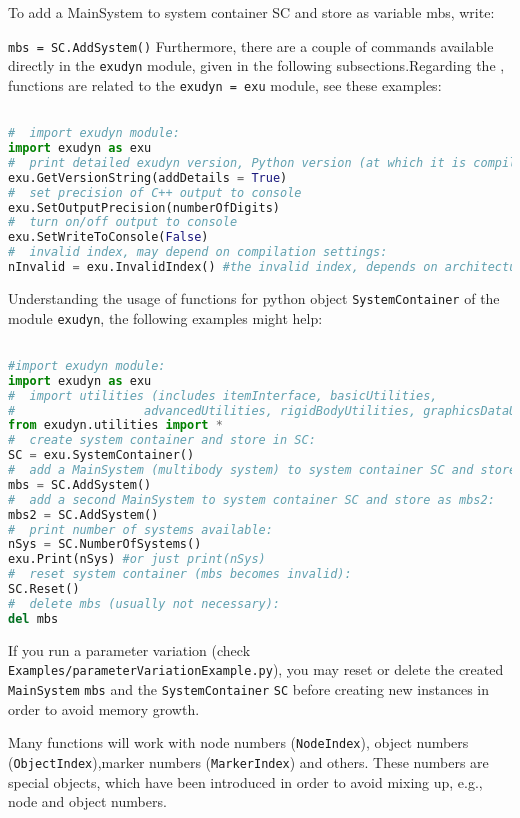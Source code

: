 To add a MainSystem to system container SC and store as variable mbs, write:
\bi
  \item[] \texttt{mbs = SC.AddSystem()}
\ei
Furthermore, there are a couple of commands available directly in the \texttt{exudyn} module, given in the following subsections.Regarding the , functions are related to the \texttt{exudyn = exu} module, see these examples:
\pythonstyle
\begin{lstlisting}[language=Python, firstnumber=1]

#  import exudyn module:
import exudyn as exu
#  print detailed exudyn version, Python version (at which it is compiled):
exu.GetVersionString(addDetails = True)
#  set precision of C++ output to console
exu.SetOutputPrecision(numberOfDigits)
#  turn on/off output to console
exu.SetWriteToConsole(False)
#  invalid index, may depend on compilation settings:
nInvalid = exu.InvalidIndex() #the invalid index, depends on architecture and version
\end{lstlisting}


Understanding the usage of functions for python object \texttt{SystemContainer} of the module \texttt{exudyn}, the following examples might help:
\pythonstyle
\begin{lstlisting}[language=Python, firstnumber=1]

#import exudyn module:
import exudyn as exu
#  import utilities (includes itemInterface, basicUtilities, 
#                  advancedUtilities, rigidBodyUtilities, graphicsDataUtilities):
from exudyn.utilities import *
#  create system container and store in SC:
SC = exu.SystemContainer()
#  add a MainSystem (multibody system) to system container SC and store as mbs:
mbs = SC.AddSystem()
#  add a second MainSystem to system container SC and store as mbs2:
mbs2 = SC.AddSystem()
#  print number of systems available:
nSys = SC.NumberOfSystems()
exu.Print(nSys) #or just print(nSys)
#  reset system container (mbs becomes invalid):
SC.Reset()
#  delete mbs (usually not necessary):
del mbs
\end{lstlisting}


If you run a parameter variation (check \texttt{Examples/parameterVariationExample.py}), you may reset or delete the created \texttt{MainSystem} \texttt{mbs} and the \texttt{SystemContainer} \texttt{SC} before creating new instances in order to avoid memory growth.

\label{sec:itemIndex}
Many functions will work with node numbers (\texttt{NodeIndex}), object numbers (\texttt{ObjectIndex}),marker numbers (\texttt{MarkerIndex}) and others. These numbers are special objects, which have been introduced in order to avoid mixing up, e.g., node and object numbers. 

